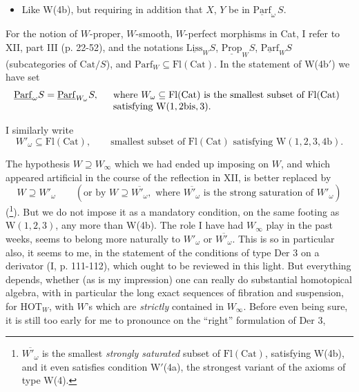 \documentclass[11pt]{article}
\newcommand{\printedpage}[1]{\marginpar{\footnotesize p.~#1}}
\newcommand{\msp}[1]{\marginpar{\footnotesize [#1]}}
\newcommand{\ul}[1]{\underline{\mathrm{#1}}}
\begin{document}
\begin{itemize}[leftmargin=4em]
\item[W(4b$'$)] Like W(4b), but requiring in addition that $X$, $Y$ be in $\ul{Parf}_\omega\, S$.
\end{itemize}

\msp{page 172}

For the notion of $W$-proper, $W$-smooth, $W$-perfect morphisms in Cat, I refer to XII, part III (p. 22-52), and the notations $\ul{Liss}_W S$, $\ul{Prop}_W S$, $\ul{Parf}_W S$ (subcategories of $\mathrm{Cat}/S$), and $\mathrm{Parf}_W \subseteq \mathrm{Fl}(\mathrm{Cat})$. In the statement of W(4b$'$) we have set
\[
\ul{Parf}_\omega S = \ul{Parf}_{W_\omega} S, \quad
\begin{array}[t]{l}
\text{where } W_\omega \subseteq \mathrm{Fl}(\mathrm{Cat}) \text{ is the smallest subset of } \mathrm{Fl}(\mathrm{Cat})\\
\text{satisfying } \mathrm{W}(1, 2\mathrm{bis}, 3).
\end{array}
\]

I similarly write
\[
W'_\omega \subseteq \mathrm{Fl}(\mathrm{Cat}), \qquad \text{smallest subset of } \mathrm{Fl}(\mathrm{Cat}) \text{ satisfying } \mathrm{W}(1, 2, 3, 4\mathrm{b}). %
\]

\printedpage{105}

The hypothesis $W \supseteq W_\infty$ which we had ended up imposing on $W$, and which appeared artificial in the course of the reflection in XII, is better replaced by %
\[
W \supseteq W'_\omega \qquad (\text{or by } W \supseteq \overline{W'_\omega}, \text{ where } \overline{W'_\omega} \text{ is the strong saturation of } W'_\omega)
\]
(\footnote{$\overline{W'_\omega}$ is the smallest \textit{strongly saturated} subset of $\mathrm{Fl}(\mathrm{Cat})$, satisfying W(4b), and it even satisfies condition W$'$(4a), the strongest variant of the axioms of type W(4).}). But we do not impose it as a mandatory condition, on the same footing as $\mathrm{W}(1,2,3)$, any more than W(4b). The role I have had $W_\infty$ play in the past weeks, seems to belong more naturally to $W'_\omega$ or $\overline{W'_\omega}$. This is so in particular also, it seems to me, in the statement of the conditions of type Der 3 on a derivator (I, p. 111-112), which ought to be reviewed in this light. But everything depends, whether (as is my impression) one can really do substantial homotopical algebra, with in particular the long exact sequences of fibration and suspension, for $\mathrm{HOT}_W$, with $W$'s which are \textit{strictly} contained in $W_\infty$. Before even being sure, it is still too early for me to pronounce on the ``right'' formulation of Der 3,
\end{document}
